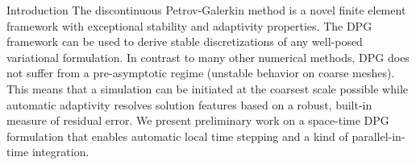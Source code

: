 \documentclass[final]{beamer}
\newlength{\onecolwid}
\begin{document}
\begin{frame}[t]
\begin{columns}[t]
\begin{column}{\onecolwid}
\begin{block}{Introduction}
The discontinuous Petrov-Galerkin method is a novel finite element framework with exceptional stability and adaptivity properties.
The DPG framework can be used to derive stable discretizations of any well-posed variational formulation.
In contrast to many other numerical methods, DPG does not suffer from a pre-asymptotic regime (unstable behavior on coarse meshes).
This means that a simulation can be initiated at the coarsest scale possible while automatic adaptivity resolves solution features 
based on a robust, built-in measure of residual error.
We present preliminary work on a space-time DPG formulation that enables automatic local time stepping and a kind of parallel-in-time integration.



\end{block}
\end{column}
\end{columns}
\end{frame}
\end{document}
